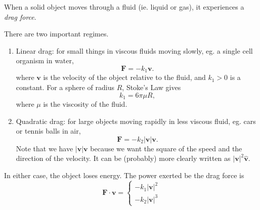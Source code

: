 \documentclass[a4paper]{article}
\begin{document}
\begin{defi}
  When a solid object moves through a fluid (ie. liquid or gas), it experiences a \emph{drag force}.

  There are two important regimes.

  \begin{enumerate}
    \item Linear drag: for small things in viscous fluids moving slowly, eg. a single cell organism in water,
      \[
        \mathbf{F} = -k_1 \mathbf{v}.
      \]
      where $\mathbf{v}$ is the velocity of the object relative to the fluid, and $k_1> 0$ is a constant. For a sphere of radius $R$, Stoke's Law gives
      \[
        k_1 = 6\pi \mu R,
      \]
      where $\mu$ is the viscosity of the fluid.
    \item Quadratic drag: for large objects moving rapidly in less viscous fluid, eg. cars or tennis balls in air,
      \[
        \mathbf{F} = -k_2|\mathbf{v}|\mathbf{v}.
      \]
      Note that we have $|\mathbf{v}|\mathbf{v}$ because we want the square of the speed and the direction of the velocity. It can be (probably) more clearly written as $|\mathbf{v}|^2 \hat{\mathbf{v}}$.

  \end{enumerate}
  In either case, the object loses energy. The power exerted be the drag force is
  \[
    \mathbf{F}\cdot \mathbf{v} = \begin{cases} -k_1|\mathbf{v}|^2\\-k_2 |\mathbf{v}|^3 \end{cases}
  \]
\end{defi}
\end{document}
